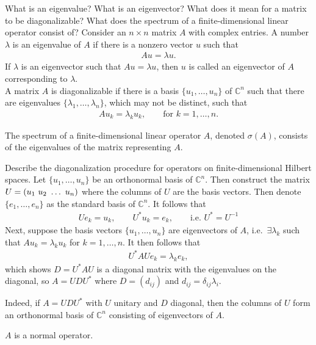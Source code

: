 \documentclass[avery5388,grid,frame]{flashcards}
\def\Cx{\mathbb{C}}
\begin{document}


\begin{flashcard}
    {What is an eigenvalue?  What is an eigenvector?  What does it mean for a matrix to be diagonalizable?  What does the spectrum of a finite-dimensional linear operator consist of?}
    Consider an $n\times n$ matrix $A$ with complex entries.  A number $\lambda$ is an eigenvalue of $A$ if there is a nonzero vector $u$ such that
    \begin{align*}
        Au = \lambda u.
    \end{align*}
    If $\lambda$ is an eigenvector such that $Au = \lambda u$, then $u$ is called an eigenvector of $A$ corresponding to $\lambda$. \\

    A matrix $A$ is diagonalizable if there is a basis $\{u_1, \dots, u_n\}$ of $\Cx^n$ such that there are eigenvalues $\{\lambda_1, \dots, \lambda_n\}$, which may not be distinct, such that
    \begin{align*}
        A u_k = \lambda_k u_k, \qquad \text{for } k = 1, \dots, n.
    \end{align*}

    The spectrum of a finite-dimensional linear operator $A$, denoted $\sigma(A)$, consists of the eigenvalues of the matrix representing $A$.
\end{flashcard}

\begin{flashcard}
    {Describe the diagonalization procedure for operators on finite-dimensional Hilbert spaces.}
    Let $\{u_1, \dots, u_n\}$ be an orthonormal basis of $\Cx^n$.  Then construct the matrix $U = \qty(u_1\ u_2\ \dots\ u_n)$ where the columns of $U$ are the basis vectors.  Then denote $\{e_1, \dots, e_n\}$ as the standard basis of $\Cx^n$.  It follows that
    \begin{align*}
        Ue_k = u_k, \qquad U^*u_k = e_k, \qquad \text{i.e.~}U^* = U^{-1}
    \end{align*}
    Next, suppose the basis vectors $\{u_1, \dots, u_n\}$ are eigenvectors of $A$, i.e.~$\exists \lambda_k$ such that $Au_k = \lambda_k u_k$ for $k = 1, \dots, n$.  It then follows that
    \begin{align*}
        U^*AUe_k = \lambda_k e_k,
    \end{align*}
    which shows $D = U^*AU$ is a diagonal matrix with the eigenvalues on the diagonal, so $A = UDU^*$ where $D = (d_{ij})$ and $d_{ij} = \delta_{ij}\lambda_i$.

    Indeed, if $A = UDU^*$ with $U$ unitary and $D$ diagonal, then the columns of $U$ form an orthonormal basis of $\Cx^n$ consisting of eigenvectors of $A$.

    $A$ is a normal operator.
\end{flashcard}
\end{document}
